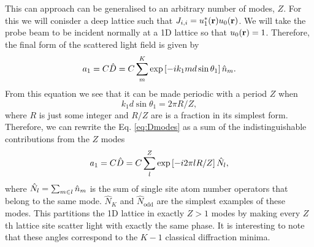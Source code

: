 This can approach can be generalised to an arbitrary number of modes,
$Z$. For this we will conisder a deep lattice such that
$J_{i,i} = u_1^* (\mathbf{r}) u_0 (\mathbf{r})$. We will take the probe beam to
be incident normally at a 1D lattice so that $u_0 (\mathbf{r}) =
1$. Therefore, the final form of the scattered light field is given by
\begin{equation}
  \label{eq:Dmodes}
  a_1 = C \hat{D} = C \sum_m^K \exp\left[-i k_1 m d \sin \theta_1
  \right] \hat{n}_m.
\end{equation}
From this equation we see that it can be made periodic with a period
$Z$ when
\begin{equation}
  k_1 d \sin \theta_1 = 2\pi R / Z,
\end{equation}
where $R$ is just some integer and $R/Z$ are is a fraction in its
simplest form. Therefore, we can rewrite the Eq. \eqref{eq:Dmodes} as
a sum of the indistinguishable contributions from the $Z$ modes
\begin{equation}
  \label{eq:Zmodes}
  a_1 = C \hat{D} = C \sum_l^Z \exp\left[-i 2 \pi l R / Z \right] \hat{N}_l,
\end{equation}
where $\hat{N}_l = \sum_{m \in l} \hat{n}_m$ is the sum of single site atom
number operators that belong to the same mode. $\hat{N}_K$ and
$\hat{N}_\mathrm{odd}$ are the simplest examples of these modes. This
partitions the 1D lattice in exactly $Z > 1$ modes by making every
$Z$th lattice site scatter light with exactly the same phase. It is
interesting to note that these angles correspond to the $K-1$
classical diffraction minima.

